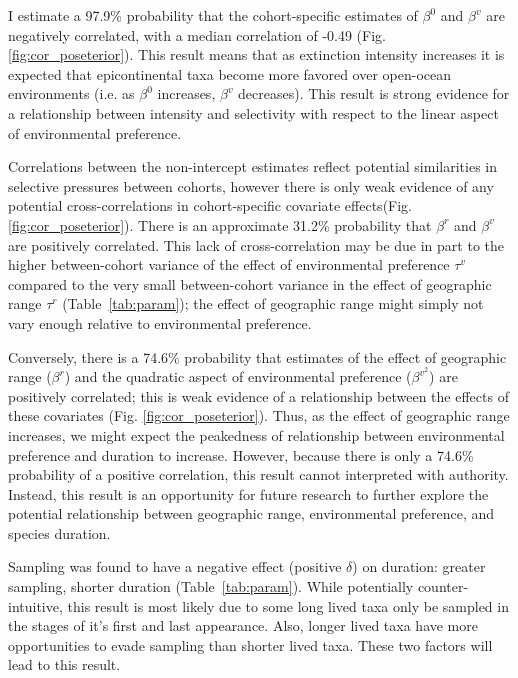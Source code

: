 \documentclass[11pt]{article}
\begin{document}
I estimate a 97.9\% probability that the cohort-specific estimates of \(\beta^{0}\) and \(\beta^{v}\) are negatively correlated, with a median correlation of -0.49 (Fig. \ref{fig:cor_poseterior}). This result means that as extinction intensity increases it is expected that epicontinental taxa become more favored over open-ocean environments (i.e. as \(\beta^{0}\) increases, \(\beta^{v}\) decreases). This result is strong evidence for a relationship between intensity and selectivity with respect to the linear aspect of environmental preference. 

Correlations between the non-intercept estimates reflect potential similarities in selective pressures between cohorts, however there is only weak evidence of any potential cross-correlations in cohort-specific covariate effects(Fig. \ref{fig:cor_poseterior}). There is an approximate 31.2\% probability that \(\beta^{r}\) and \(\beta^{v}\) are positively correlated. This lack of cross-correlation may be due in part to the higher between-cohort variance of the effect of environmental preference \(\tau^{v}\) compared to the very small between-cohort variance in the effect of geographic range \(\tau^{r}\) (Table~\ref{tab:param}); the effect of geographic range might simply not vary enough relative to environmental preference. 

Conversely, there is a 74.6\% probability that estimates of the effect of geographic range (\(\beta^{r}\)) and the quadratic aspect of environmental preference (\(\beta^{v^{2}}\)) are positively correlated; this is weak evidence of a relationship between the effects of these covariates (Fig. \ref{fig:cor_poseterior}). Thus, as the effect of geographic range increases, we might expect the peakedness of relationship between environmental preference and duration to increase. However, because there is only a 74.6\% probability of a positive correlation, this result cannot interpreted with authority. Instead, this result is an opportunity for future research to further explore the potential relationship between geographic range, environmental preference, and species duration.

Sampling was found to have a negative effect (positive \(\delta\)) on duration: greater sampling, shorter duration (Table~\ref{tab:param}). While potentially counter-intuitive, this result is most likely due to some long lived taxa only be sampled in the stages of it's first and last appearance. Also, longer lived taxa have more opportunities to evade sampling than shorter lived taxa. These two factors will lead to this result. 
\end{document}
